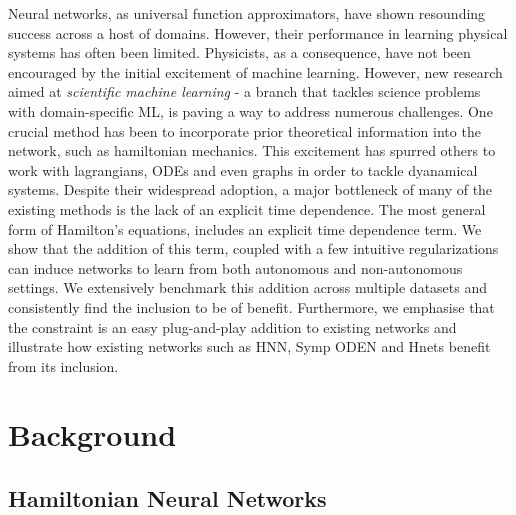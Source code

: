 \documentclass[twoside]{article}
\begin{document}
Neural networks, as universal function approximators, have shown resounding success across a host of domains. However, their performance in learning physical systems has often been limited. Physicists, as a consequence, have not been encouraged by the initial excitement of machine learning. However, new research aimed at \textit{scientific machine learning} - a branch that tackles science problems with domain-specific ML, is paving a way to address numerous challenges. One crucial method has been to incorporate prior theoretical information into the network, such as hamiltonian mechanics. This excitement has spurred others to work with lagrangians, ODEs and even graphs in order to tackle dyanamical systems. Despite their widespread adoption, a major bottleneck of many of the existing methods is the lack of an explicit time dependence. The most general form of Hamilton's equations, includes an explicit time dependence term. We show that the addition of this term, coupled with a few intuitive regularizations can induce networks to learn from both autonomous and non-autonomous settings. We extensively benchmark this addition across multiple datasets and consistently find the inclusion to be of benefit. Furthermore, we emphasise that the constraint is an easy plug-and-play addition to existing networks and illustrate how existing networks such as HNN, Symp ODEN and Hnets benefit from its inclusion. 

\section{Background}

\subsection{Hamiltonian Neural Networks}
\end{document}

